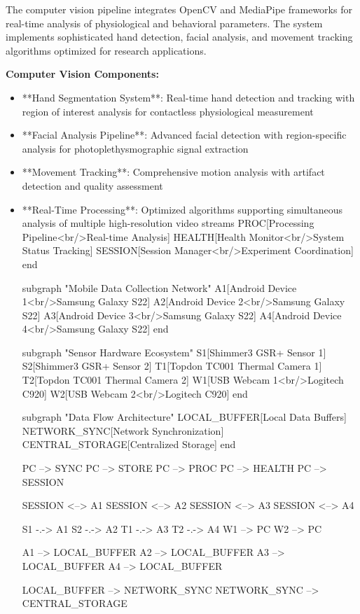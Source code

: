 \documentclass[12pt,a4paper]{report}
\begin{document}
The computer vision pipeline integrates OpenCV and MediaPipe frameworks for real-time analysis of physiological and
behavioral parameters. The system implements sophisticated hand detection, facial analysis, and movement tracking
algorithms optimized for research applications.

\textbf{Computer Vision Components:}

\begin{itemize}
\item **Hand Segmentation System**: Real-time hand detection and tracking with region of interest analysis for contactless
  physiological measurement
\item **Facial Analysis Pipeline**: Advanced facial detection with region-specific analysis for photoplethysmographic signal
  extraction
\item **Movement Tracking**: Comprehensive motion analysis with artifact detection and quality assessment
\item **Real-Time Processing**: Optimized algorithms supporting simultaneous analysis of multiple high-resolution video
  streams
  PROC[Processing Pipeline<br/>Real-time Analysis]
  HEALTH[Health Monitor<br/>System Status Tracking]
  SESSION[Session Manager<br/>Experiment Coordination]
  end

  subgraph "Mobile Data Collection Network"
  A1[Android Device 1<br/>Samsung Galaxy S22]
  A2[Android Device 2<br/>Samsung Galaxy S22]
  A3[Android Device 3<br/>Samsung Galaxy S22]
  A4[Android Device 4<br/>Samsung Galaxy S22]
  end

  subgraph "Sensor Hardware Ecosystem"
  S1[Shimmer3 GSR+ Sensor 1]
  S2[Shimmer3 GSR+ Sensor 2]
  T1[Topdon TC001 Thermal Camera 1]
  T2[Topdon TC001 Thermal Camera 2]
  W1[USB Webcam 1<br/>Logitech C920]
  W2[USB Webcam 2<br/>Logitech C920]
  end

  subgraph "Data Flow Architecture"
  LOCAL\_BUFFER[Local Data Buffers]
  NETWORK\_SYNC[Network Synchronization]
  CENTRAL\_STORAGE[Centralized Storage]
  end

  PC --> SYNC
  PC --> STORE
  PC --> PROC
  PC --> HEALTH
  PC --> SESSION

  SESSION <--> A1
  SESSION <--> A2
  SESSION <--> A3
  SESSION <--> A4

  S1 -.-> A1
  S2 -.-> A2
  T1 -.-> A3
  T2 -.-> A4
  W1 --> PC
  W2 --> PC

  A1 --> LOCAL\_BUFFER
  A2 --> LOCAL\_BUFFER
  A3 --> LOCAL\_BUFFER
  A4 --> LOCAL\_BUFFER

  LOCAL\_BUFFER --> NETWORK\_SYNC
  NETWORK\_SYNC --> CENTRAL\_STORAGE


\end{itemize}
\end{document}
